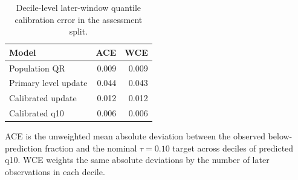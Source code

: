 \begin{table}[!htbp]
\caption{Decile-level later-window quantile calibration error in the assessment split.}
\label{tab:calibration_error}
\centering
\begin{tabular}{lrr}
\hline
Model & ACE & WCE\\
\hline
Population QR & 0.009 & 0.009\\
Primary level update & 0.044 & 0.043\\
Calibrated update & 0.012 & 0.012\\
Calibrated q10 & 0.006 & 0.006\\
\hline
\end{tabular}
\par\smallskip
\footnotesize{ACE is the unweighted mean absolute deviation between the observed below-prediction fraction and the nominal $\tau=0.10$ target across deciles of predicted q10. WCE weights the same absolute deviations by the number of later observations in each decile.}
\end{table}

